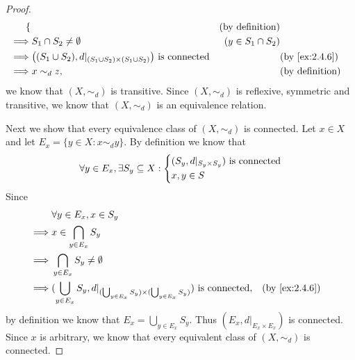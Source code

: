 \begin{proof}
\begin{align*}
\begin{dcases}
                                              \end{dcases}                                       &                      & \text{(by definition)}        \\
    \implies & S_1 \cap S_2 \neq \emptyset                                                              & (y \in S_1 \cap S_2)                          \\
    \implies & \big((S_1 \cup S_2), d|_{(S_1 \cup S_2) \times (S_1 \cup S_2)}\big) \text{ is connected} &                      & \by{ex:2.4.6}          \\
    \implies & x \sim_d z,                                                                              &                      & \text{(by definition)}
  \end{align*}
  we know that \((X, \sim_d)\) is transitive.
  Since \((X, \sim_d)\) is reflexive, symmetric and transitive, we know that \((X, \sim_d)\) is an equivalence relation.

  Next we show that every equivalence class of \((X, \sim_d)\) is connected.
  Let \(x \in X\) and let \(E_x = \{y \in X : x \sim_d y\}\).
  By definition we know that
  \[
    \forall y \in E_x, \exists S_y \subseteq X : \begin{dcases}
      (S_y, d|_{S_y \times S_y}) \text{ is connected} \\
      x, y \in S
    \end{dcases}
  \]
  Since
  \begin{align*}
             & \forall y \in E_x, x \in S_y                                                                                                        \\
    \implies & x \in \bigcap_{y \in E_x} S_y                                                                                                       \\
    \implies & \bigcap_{y \in E_x} S_y \neq \emptyset                                                                                              \\
    \implies & (\bigcup_{y \in E_x} S_y, d|_{(\bigcup_{y \in E_x} S_y) \times (\bigcup_{y \in E_x} S_y)}) \text{ is connected}, &  & \by{ex:2.4.6}
  \end{align*}
  by definition we know that \(E_x = \bigcup_{y \in E_x} S_y\).
  Thus \((E_x, d|_{E_x \times E_x})\) is connected.
  Since \(x\) is arbitrary, we know that every equivalent class of \((X, \sim_d)\) is connected.


\end{proof}
